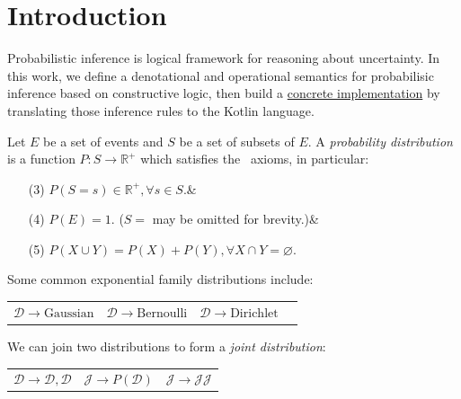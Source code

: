 \documentclass{article}
\begin{document}
\section{Introduction}\label{sec:intro}

Probabilistic inference is logical framework for reasoning about uncertainty. In this work, we define a denotational and operational semantics for probabilisic inference based on constructive logic, then build a \href{https://github.com/breandan/markovian}{concrete implementation} by translating those inference rules to the Kotlin language.

Let $E$ be a set of events and $S$ be a set of subsets of $E$. A \textit{probability distribution} is a function $P: S \rightarrow \mathbb{R}^{+}$ which satisfies the~\citet{kolmogorov1933grundbegriffe} axioms, in particular:

\begin{itemize}
    \itemsep-1em
    \item [(3)] $P(S = s) \in \mathbb{R}^{+}, \forall s \in S$.& \\
    \item [(4)] $P(E) = 1$. ($S = $ may be omitted for brevity.)& \\
    \item [(5)] $P(X \cup Y) = P(X) + P(Y), \forall X \cap Y = \varnothing$.
\end{itemize}



%

Some common exponential family distributions include:

\begin{tabular}{cccc}
    $\mathcal{D} \rightarrow \text{Gaussian}$ &
    $\mathcal{D} \rightarrow \text{Bernoulli}$ &
    $\mathcal{D} \rightarrow \text{Dirichlet}$ &
\end{tabular}

We can join two distributions to form a \textit{joint distribution}:

\begin{center}
\begin{tabular}{ccc}
    $\mathcal{D} \rightarrow \mathcal{D}, \mathcal{D}$ &$\mathcal{J} \rightarrow P(\mathcal{D})$ &$\mathcal{J} \rightarrow \mathcal{J}\mathcal{J}$
\end{tabular}
\end{center}
\end{document}
